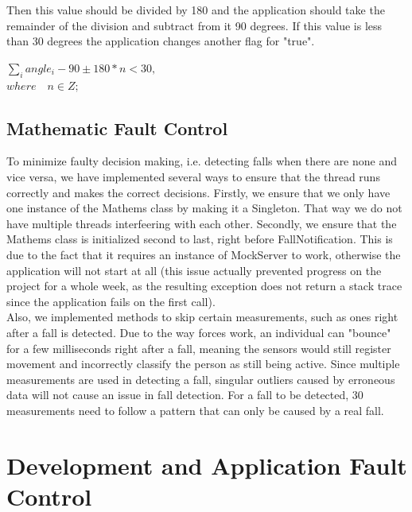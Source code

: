 \documentclass[hidelinks,conference,12pt]{IEEETran}
\begin{document}
Then this value should be divided by 180 and the application should take the remainder of the division and subtract from it 90 degrees. If this value is less than 30 degrees the application changes another flag for "true".
\begin{center}
	${\sum}_i angle_i - 90 \pm 180 * n < 30,$ \\
	$where \quad n \in Z; $
\end{center}

\subsection{Mathematic Fault Control}
To minimize faulty decision making, i.e. detecting falls when there are none and vice versa, we have implemented several ways to ensure that the thread runs correctly and makes the correct decisions. Firstly, we ensure that we only have one instance of the Mathems class by making it a Singleton. That way we do not have multiple threads interfeering with each other. Secondly, we ensure that the Mathems class is initialized second to last, right before FallNotification. This is due to the fact that it requires an instance of MockServer to work, otherwise the application will not start at all (this issue actually prevented progress on the project for a whole week, as the resulting exception does not return a stack trace since the application fails on the first call).\\
Also, we implemented methods to skip certain measurements, such as ones right after a fall is detected. Due to the way forces work, an individual can "bounce" for a few milliseconds right after a fall, meaning the sensors would still register movement and incorrectly classify the person as still being active. Since multiple measurements are used in detecting a fall, singular outliers caused by erroneous data will not cause an issue in fall detection. For a fall to be detected, 30 measurements need to follow a pattern that can only be caused by a real fall. 

\section{Development and Application Fault Control}
\end{document}
